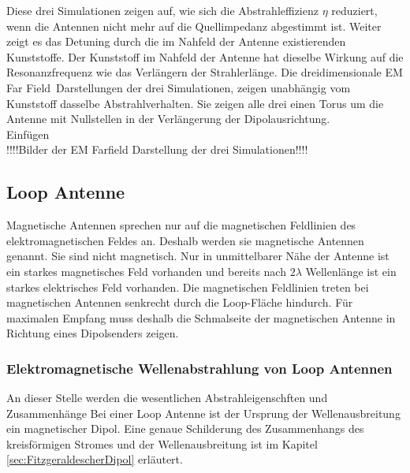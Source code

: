Diese drei Simulationen zeigen auf, wie sich die Abstrahleffizienz $\eta$ reduziert, wenn die Antennen nicht mehr auf die Quellimpedanz abgestimmt ist. Weiter zeigt es das Detuning durch die im Nahfeld der Antenne existierenden Kunststoffe. Der Kunststoff im Nahfeld der Antenne hat dieselbe Wirkung auf die Resonanzfrequenz wie das Verlängern der  Strahlerlänge.
Die dreidimensionale \glqq EM Far Field\grqq \  Darstellungen der drei Simulationen, zeigen unabhängig vom Kunststoff dasselbe Abstrahlverhalten. Sie zeigen alle drei einen Torus um die Antenne mit Nullstellen in der Verlängerung der Dipolausrichtung.\\

Einfügen\\
!!!!Bilder der EM Farfield Darstellung der drei Simulationen!!!!







\subsection{Loop Antenne}
Magnetische Antennen sprechen nur auf die magnetischen Feldlinien des elektromagnetischen Feldes an. Deshalb werden sie magnetische Antennen genannt. Sie sind nicht magnetisch. Nur in unmittelbarer Nähe der Antenne ist ein starkes magnetisches Feld vorhanden und bereits nach $2\lambda$ Wellenlänge ist ein starkes elektrisches Feld vorhanden. Die magnetischen Feldlinien treten bei magnetischen Antennen senkrecht durch die Loop-Fläche hindurch. Für maximalen Empfang muss deshalb die Schmalseite der magnetischen Antenne in Richtung eines Dipolsenders  zeigen.

\subsubsection{Elektromagnetische Wellenabstrahlung von Loop Antennen}
An dieser Stelle werden die wesentlichen Abstrahleigenschften und Zusammenhänge 
Bei einer Loop Antenne ist der Ursprung der Wellenausbreitung ein magnetischer Dipol. Eine genaue Schilderung des Zusammenhangs des kreisförmigen Stromes und der Wellenausbreitung ist im Kapitel \ref{sec:FitzgeraldescherDipol} erläutert. 

